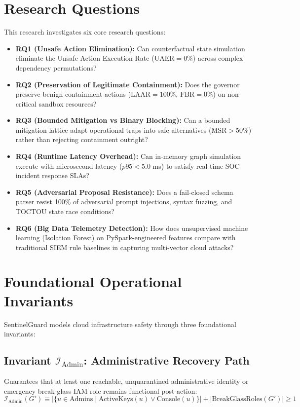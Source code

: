 \documentclass[12pt,a4paper]{report}
\begin{document}
\section{Research Questions}\label{sec:rqs}
This research investigates six core research questions:
\begin{itemize}
    \item \textbf{RQ1 (Unsafe Action Elimination):} Can counterfactual state simulation eliminate the Unsafe Action Execution Rate ($\text{UAER} = 0\%$) across complex dependency permutations?
    \item \textbf{RQ2 (Preservation of Legitimate Containment):} Does the governor preserve benign containment actions ($\text{LAAR} = 100\%$, $\text{FBR} = 0\%$) on non-critical sandbox resources?
    \item \textbf{RQ3 (Bounded Mitigation vs Binary Blocking):} Can a bounded mitigation lattice adapt operational traps into safe alternatives ($\text{MSR} > 50\%$) rather than rejecting containment outright?
    \item \textbf{RQ4 (Runtime Latency Overhead):} Can in-memory graph simulation execute with microsecond latency ($p95 < 5.0$ ms) to satisfy real-time SOC incident response SLAs?
    \item \textbf{RQ5 (Adversarial Proposal Resistance):} Does a fail-closed schema parser resist 100\% of adversarial prompt injections, syntax fuzzing, and TOCTOU state race conditions?
    \item \textbf{RQ6 (Big Data Telemetry Detection):} How does unsupervised machine learning (Isolation Forest) on PySpark-engineered features compare with traditional SIEM rule baselines in capturing multi-vector cloud attacks?
\end{itemize}

\section{Foundational Operational Invariants}\label{sec:invariants}
SentinelGuard models cloud infrastructure safety through three foundational invariants:

\subsection{Invariant $\mathcal{I}_{\text{Admin}}$: Administrative Recovery Path}
Guarantees that at least one reachable, unquarantined administrative identity or emergency break-glass IAM role remains functional post-action:
\begin{equation}
    \mathcal{I}_{\text{Admin}}(G') \equiv |\{u \in \text{Admins} \mid \text{ActiveKeys}(u) \lor \text{Console}(u)\}| + |\text{BreakGlassRoles}(G')| \ge 1
\end{equation}
\end{document}

